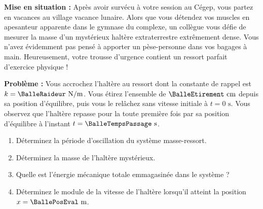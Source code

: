 \textbf{Mise en situation :} Après avoir survécu à votre session au Cégep, vous partez en vacances au village vacance lunaire. Alors que vous détendez vos muscles en apesanteur apparente dans le gymnase du complexe, un collègue vous défie de mesurer la masse d'un mystérieux haltère extraterrestre extrêmement dense. Vous n'avez évidemment pas pensé à apporter un pèse-personne dans vos bagages à main. Heureusement, votre trousse d'urgence contient un ressort parfait d'exercice physique !

\textbf{Problème :} Vous accrochez l'haltère au ressort dont la constante de rappel est $k = \BalleRaideur\text{ N/m}$. Vous étirez l'ensemble de $\BalleEtirement\text{ cm}$ depuis sa position d'équilibre, puis vous le relâchez sans vitesse initiale à $t = 0\text{ s}$. Vous observez que l'haltère repasse pour la toute première fois par sa position d'équilibre à l'instant $t = \BalleTempsPassage\text{ s}$.

\begin{enumerate}[label=\alph*)]
    \item Déterminez la période d'oscillation du système masse-ressort.
    \item Déterminez la masse de l'haltère mystérieux.
    \item Quelle est l'énergie mécanique totale emmagasinée dans le système ?
    \item Déterminez le module de la vitesse de l'haltère lorsqu'il atteint la position $x = \BallePosEval\text{ m}$.
\end{enumerate}